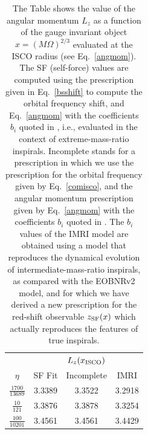 \begin{table}[thb]
\begin{tabular}{|c|c|c|c|}
\hline\multicolumn{1}{|c|}{}&\multicolumn{3}{c|}{\(L_z(x_{\rm ISCO} )\)}\\\cline{2-4}
\multicolumn{1}{|c|}{\(\eta\)}&SF Fit&Incomplete&IMRI \\\cline{1-4}
$\frac{1700}{13689}$&3.3389 &3.3522&3.2918 \\[1ex]\cline{1-4}
$\frac{10}{121}$& 3.3876&3.3878&3.3254\\ [1ex]\cline{1-4}
$\frac{100}{10201}$& 3.4561&3.4561&3.4429\\[1ex]\hline
\end{tabular}
\caption{ The Table shows the value of the angular momentum \(L_z\) as a function of the gauge invariant object \(x=\left(M\Omega \right)^{2/3}\)  evaluated at the ISCO radius (see Eq.~\eqref{angmom}). The SF (self-force) values are computed using the prescription given in Eq.~\eqref{bsshift} to compute the orbital frequency shift, and Eq.~\eqref{angmom} with the coefficients \(b_i\) quoted in \cite{barus}, i.e., evaluated in the context of extreme-mass-ratio inspirals. Incomplete stands for a prescription in which we use the prescription for the orbital frequency given by Eq.~\eqref{comisco}, and the angular momentum prescription given by  Eq.~\eqref{angmom} with the coefficients \(b_i\) quoted in \cite{barus}. The   \(b_i\) values of the IMRI model are obtained using a model that reproduces the dynamical evolution of intermediate-mass-ratio inspirals, as compared with the EOBNRv2 model, and for which we have derived a new prescription for the red-shift observable \(z_{\rm SF} (x)\) which actually 
reproduces the features of true inspirals.}
\label{lzcomp}
\end{table}


